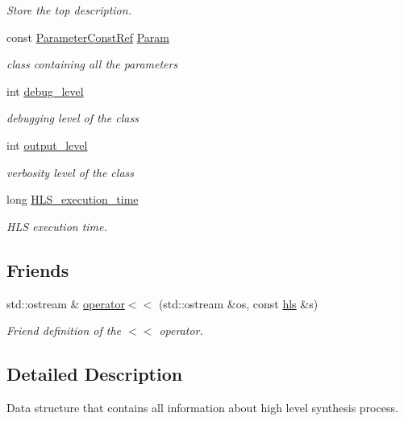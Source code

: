 \begin{DoxyCompactItemize}
\begin{DoxyCompactList}\small\item\em Store the top description. \end{DoxyCompactList}\item 
const \hyperlink{Parameter_8hpp_a37841774a6fcb479b597fdf8955eb4ea}{Parameter\+Const\+Ref} \hyperlink{classhls_a97e43df586a38ff6051d75c21560ff48}{Param}
\begin{DoxyCompactList}\small\item\em class containing all the parameters \end{DoxyCompactList}\item 
int \hyperlink{classhls_a1d9555199b62e7dea9e1c9b2e69d7181}{debug\+\_\+level}
\begin{DoxyCompactList}\small\item\em debugging level of the class \end{DoxyCompactList}\item 
int \hyperlink{classhls_ad0053ca147e2bc74a7dd81a55f35efd5}{output\+\_\+level}
\begin{DoxyCompactList}\small\item\em verbosity level of the class \end{DoxyCompactList}\item 
long \hyperlink{classhls_a5a0e69b4bb4c60bd109d21cd985a3a16}{H\+L\+S\+\_\+execution\+\_\+time}
\begin{DoxyCompactList}\small\item\em H\+LS execution time. \end{DoxyCompactList}\end{DoxyCompactItemize}
\subsection*{Friends}
\begin{DoxyCompactItemize}
\item 
std\+::ostream \& \hyperlink{classhls_a3b25e051db859b21027f26e73fc19d71}{operator$<$$<$} (std\+::ostream \&os, const \hyperlink{classhls}{hls} \&s)
\begin{DoxyCompactList}\small\item\em Friend definition of the $<$$<$ operator. \end{DoxyCompactList}\end{DoxyCompactItemize}


\subsection{Detailed Description}
Data structure that contains all information about high level synthesis process. 

